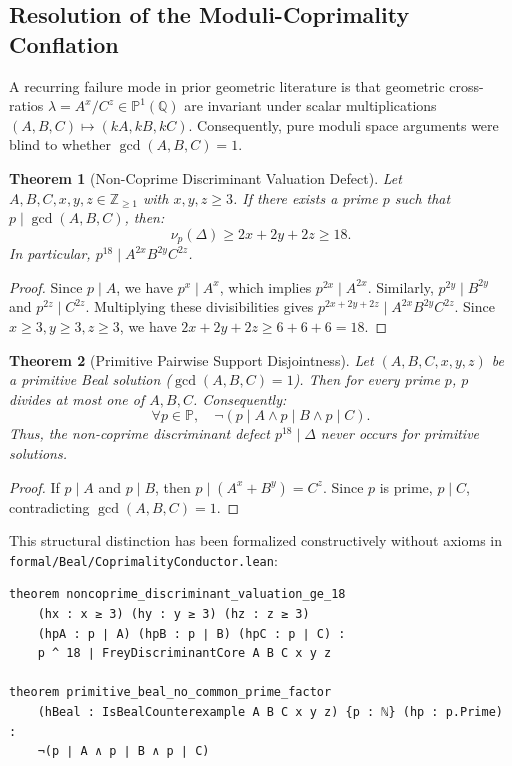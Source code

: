 \documentclass[11pt,reqno]{amsart}
\newtheorem{theorem}{Theorem}[section]
\theoremstyle{definition}
\theoremstyle{remark}
\numberwithin{equation}{section}
\begin{document}
\subsection{Resolution of the Moduli-Coprimality Conflation}
A recurring failure mode in prior geometric literature is that geometric cross-ratios $\lambda = A^x / C^z \in \mathbb{P}^1(\mathbb{Q})$ are invariant under scalar multiplications $(A, B, C) \mapsto (kA, kB, kC)$. Consequently, pure moduli space arguments were blind to whether $\gcd(A, B, C) = 1$.

\begin{theorem}[Non-Coprime Discriminant Valuation Defect]\label{thm:val18}
Let $A, B, C, x, y, z \in \mathbb{Z}_{\ge 1}$ with $x, y, z \ge 3$. If there exists a prime $p$ such that $p \mid \gcd(A, B, C)$, then:
\begin{equation}
\nu_p(\Delta) \ge 2x + 2y + 2z \ge 18.
\end{equation}
In particular, $p^{18} \mid A^{2x} B^{2y} C^{2z}$.
\end{theorem}

\begin{proof}
Since $p \mid A$, we have $p^x \mid A^x$, which implies $p^{2x} \mid A^{2x}$. Similarly, $p^{2y} \mid B^{2y}$ and $p^{2z} \mid C^{2z}$. Multiplying these divisibilities gives $p^{2x+2y+2z} \mid A^{2x} B^{2y} C^{2z}$. Since $x \ge 3, y \ge 3, z \ge 3$, we have $2x + 2y + 2z \ge 6 + 6 + 6 = 18$.
\end{proof}

\begin{theorem}[Primitive Pairwise Support Disjointness]\label{thm:coprime_disjoint}
Let $(A, B, C, x, y, z)$ be a primitive Beal solution ($\gcd(A, B, C) = 1$). Then for every prime $p$, $p$ divides at most one of $A, B, C$. Consequently:
\begin{equation}
\forall p \in \mathbb{P}, \quad \neg(p \mid A \land p \mid B \land p \mid C).
\end{equation}
Thus, the non-coprime discriminant defect $p^{18} \mid \Delta$ never occurs for primitive solutions.
\end{theorem}

\begin{proof}
If $p \mid A$ and $p \mid B$, then $p \mid (A^x + B^y) = C^z$. Since $p$ is prime, $p \mid C$, contradicting $\gcd(A, B, C) = 1$.
\end{proof}

This structural distinction has been formalized constructively without axioms in \texttt{formal/Beal/CoprimalityConductor.lean}:
\begin{verbatim}
theorem noncoprime_discriminant_valuation_ge_18
    (hx : x ≥ 3) (hy : y ≥ 3) (hz : z ≥ 3)
    (hpA : p ∣ A) (hpB : p ∣ B) (hpC : p ∣ C) :
    p ^ 18 ∣ FreyDiscriminantCore A B C x y z

theorem primitive_beal_no_common_prime_factor
    (hBeal : IsBealCounterexample A B C x y z) {p : ℕ} (hp : p.Prime) :
    ¬(p ∣ A ∧ p ∣ B ∧ p ∣ C)
\end{verbatim}
\end{document}
